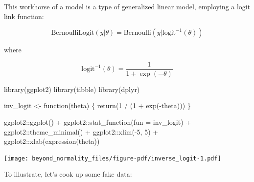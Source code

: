 \documentclass[
  letterpaper,
  DIV=11,
  numbers=noendperiod]{scrreprt}
\newenvironment{Shaded}{\begin{snugshade}}{\end{snugshade}}
\newcommand{\AttributeTok}[1]{\textcolor[rgb]{0.40,0.45,0.13}{#1}}
\newcommand{\ControlFlowTok}[1]{\textcolor[rgb]{0.00,0.23,0.31}{#1}}
\newcommand{\DecValTok}[1]{\textcolor[rgb]{0.68,0.00,0.00}{#1}}
\newcommand{\FunctionTok}[1]{\textcolor[rgb]{0.28,0.35,0.67}{#1}}
\newcommand{\NormalTok}[1]{\textcolor[rgb]{0.00,0.23,0.31}{#1}}
\newcommand{\OtherTok}[1]{\textcolor[rgb]{0.00,0.23,0.31}{#1}}
\newcommand{\SpecialCharTok}[1]{\textcolor[rgb]{0.37,0.37,0.37}{#1}}
\begin{document}
This workhorse of a model is a type of generalized linear model,
employing a logit link function:

\[
\text{BernoulliLogit}(y|\theta) = \text{Bernoulli}(y|\text{logit}^{-1}(\theta))
\]

where

\[
\text{logit}^{-1}(\theta) = \frac{1}{1 + \exp(-\theta)}
\]

\begin{Shaded}
\begin{Highlighting}[]
\FunctionTok{library}\NormalTok{(ggplot2)}
\FunctionTok{library}\NormalTok{(tibble)}
\FunctionTok{library}\NormalTok{(dplyr)}

\NormalTok{inv\_logit }\OtherTok{\textless{}{-}} \ControlFlowTok{function}\NormalTok{(theta) \{}
  \FunctionTok{return}\NormalTok{(}\DecValTok{1} \SpecialCharTok{/}\NormalTok{ (}\DecValTok{1} \SpecialCharTok{+} \FunctionTok{exp}\NormalTok{(}\SpecialCharTok{{-}}\NormalTok{theta)))}
\NormalTok{\}}

\NormalTok{ggplot2}\SpecialCharTok{::}\FunctionTok{ggplot}\NormalTok{() }\SpecialCharTok{+}
\NormalTok{  ggplot2}\SpecialCharTok{::}\FunctionTok{stat\_function}\NormalTok{(}\AttributeTok{fun =}\NormalTok{ inv\_logit) }\SpecialCharTok{+}
\NormalTok{  ggplot2}\SpecialCharTok{::}\FunctionTok{theme\_minimal}\NormalTok{() }\SpecialCharTok{+}
\NormalTok{  ggplot2}\SpecialCharTok{::}\FunctionTok{xlim}\NormalTok{(}\SpecialCharTok{{-}}\DecValTok{5}\NormalTok{, }\DecValTok{5}\NormalTok{) }\SpecialCharTok{+}
\NormalTok{  ggplot2}\SpecialCharTok{::}\FunctionTok{xlab}\NormalTok{(}\FunctionTok{expression}\NormalTok{(theta))}
\end{Highlighting}
\end{Shaded}

\begin{center}
\texttt{[image: beyond\_normality\_files/figure-pdf/inverse\_logit-1.pdf]}
\end{center}

To illustrate, let's cook up some fake data:
\end{document}
